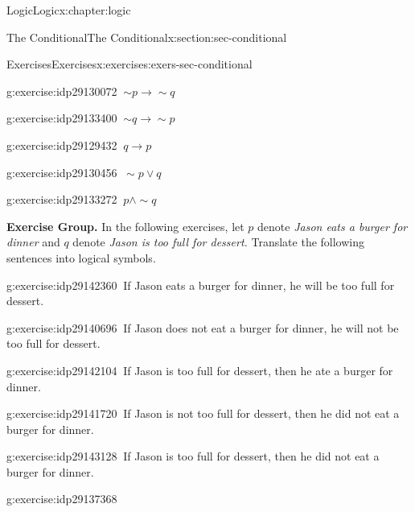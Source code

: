 \documentclass[twoside,10pt,]{book}
\numberwithin{equation}{section}
\newcommand{\inverse}{{\sim\!{p}{} {\rightarrow} \sim\!{q}{}}}
\newcommand{\converse}{{q {\rightarrow} p}}
\newcommand{\contrapositive}{{\sim\!{q}{} {\rightarrow} \sim\!{p}{}}}
\begin{document}
\begin{chapterptx}{Logic}{}{Logic}{}{}{x:chapter:logic}
\begin{sectionptx}{The Conditional}{}{The Conditional}{}{}{x:section:sec-conditional}
\begin{exercises-subsection}{Exercises}{}{Exercises}{}{}{x:exercises:exers-sec-conditional}
\begin{exercisegroup}
\begin{divisionexerciseeg}{2}{}{}{g:exercise:idp29130072}
\(\ \inverse\)\end{divisionexerciseeg}%
\begin{divisionexerciseeg}{3}{}{}{g:exercise:idp29133400}%
\(\ \contrapositive\)\end{divisionexerciseeg}%
\begin{divisionexerciseeg}{4}{}{}{g:exercise:idp29129432}%
\(\ \converse\)\end{divisionexerciseeg}%
\begin{divisionexerciseeg}{5}{}{}{g:exercise:idp29130456}%
\(\ \sim\!{p}{\vee} q\)\end{divisionexerciseeg}%
\begin{divisionexerciseeg}{6}{}{}{g:exercise:idp29133272}%
\(\ p{\wedge}\sim\!{q}\)\end{divisionexerciseeg}%
\end{exercisegroup}
\par\medskip\noindent
\par\medskip\noindent%
\textbf{Exercise Group.}\space\space%
In the following exercises, let \(p\) denote \emph{Jason eats a burger for dinner} and \(q\) denote \emph{Jason is too full for dessert.}  Translate the following sentences into logical symbols.\begin{exercisegroup}
\begin{divisionexerciseeg}{7}{}{}{g:exercise:idp29142360}%
\(\ \)If Jason eats a burger for dinner, he will be too full for dessert.\end{divisionexerciseeg}%
\begin{divisionexerciseeg}{8}{}{}{g:exercise:idp29140696}%
\(\ \)If Jason does not eat a burger for dinner, he will not be too full for dessert.\end{divisionexerciseeg}%
\begin{divisionexerciseeg}{9}{}{}{g:exercise:idp29142104}%
\(\ \)If Jason is too full for dessert, then he ate a burger for dinner.\end{divisionexerciseeg}%
\begin{divisionexerciseeg}{10}{}{}{g:exercise:idp29141720}%
\(\ \)If Jason is not too full for dessert, then he did not eat a burger for dinner.\end{divisionexerciseeg}%
\begin{divisionexerciseeg}{11}{}{}{g:exercise:idp29143128}%
\(\ \)If Jason is too full for dessert, then he did not eat a burger for dinner.\end{divisionexerciseeg}%
\begin{divisionexerciseeg}{12}{}{}{g:exercise:idp29137368}%

\end{divisionexerciseeg}
\end{exercisegroup}
\end{exercises-subsection}
\end{sectionptx}
\end{chapterptx}
\end{document}
